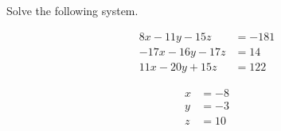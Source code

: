 
\begin{question}
Solve the following system.

\[\begin{align}
8 x - 11 y - 15 z&=-181\\
- 17 x - 16 y - 17 z&=14\\
11 x - 20 y + 15 z&=122
\end{align}\]
\begin{answerlist}
  \item 
  \item 
  \item 
\end{answerlist}
\end{question}

\begin{solution}
\[\begin{align}
x&=-8\\
y&=-3\\
z&=10
\end{align}\]
\end{solution}


